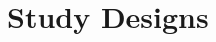 \documentclass[11pt, chapterprefix=true]{scrbook}\usepackage[]{graphicx}\usepackage[]{color}
\begin{document}
\begin{exercises}
%
%
%
%
%
%
%
%
%

\end{exercises}
\onecolumn



\chapter{Study Designs}
\label{chap:ch5}
\end{document}
